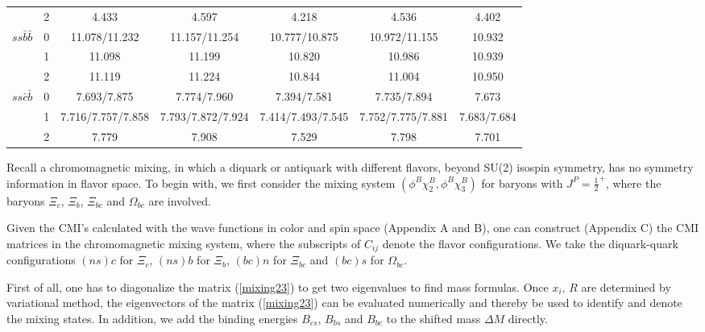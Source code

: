 \documentclass[prd,twocolumn,floatfix,nofootinbib]{revtex4}
\begin{document}
\begin{table}[!htbp]
\begin{tabular}{ccccccc}
                        &2      &4.433                  &4.597                               &4.218                               &4.536                  &4.402 \\
        $ss\bar{b}\bar{b}$
                        &0      &11.078/11.232          &11.157/11.254                       &10.777/10.875                       &10.972/11.155          &10.932 \\
                        &1      &11.098                 &11.199                              &10.820                              &10.986                 &10.939 \\
                        &2      &11.119                 &11.224                              &10.844                              &11.004                 &10.950 \\
        $ss\bar{c}\bar{b}$
                        &0      &7.693/7.875            &7.774/7.960                         &7.394/7.581                         &7.735/7.894            &7.673 \\
                        &1      &7.716/7.757/7.858      &7.793/7.872/7.924                   &7.414/7.493/7.545                   &7.752/7.775/7.881      &7.683/7.684 \\
                        &2      &7.779                  &7.908                               &7.529                               &7.798                  &7.701 \\
        \hline\hline
    \end{tabular}
\end{table}

Recall a chromomagnetic mixing, in which a diquark or antiquark with different flavors, beyond SU(2) isospin symmetry, has no symmetry information in flavor space. 
To begin with, we first consider the mixing system $(\phi^{B}\chi_{2}^{B},\phi^{B}\chi_{3}^{B})$ for baryons with $J^{P}={\frac{1}{2}}^{+}$, where the baryons $\Xi_{c}$, $\Xi_{b}$, $\Xi_{bc}$ and $\Omega_{bc}$ are involved.

Given the CMI's calculated with the wave functions in color and spin space (Appendix A and B), one can construct (Appendix C) the CMI matrices in the chromomagnetic mixing system, where the subscripts of $C_{ij}$ denote the flavor configurations. 
We take the diquark-quark configurations $(ns)c$ for $\Xi_{c}$, $(ns)b$ for $\Xi_{b}$, $(bc)n$ for $\Xi_{bc}$ and $(bc)s$ for $\Omega_{bc}$. 

First of all, one has to diagonalize the matrix (\ref{mixing23}) to get two eigenvalues to find mass formulas. 
Once $x_{i}$, $R$ are determined by variational method, the eigenvectors of the matrix (\ref{mixing23}) can be evaluated numerically and thereby be used to identify and denote the mixing states.
In addition, we add the binding energies $B_{cs}$, $B_{bs}$ and $B_{bc}$ to the shifted mass $\Delta M$ directly. 
\end{document}
